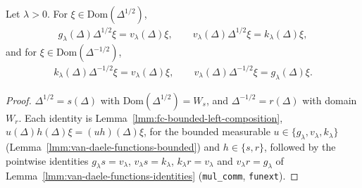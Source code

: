 \begin{lemma}
    \label{lmm:van-daele-fc-products}
    \leanok
    Let $\lambda > 0$. For $\xi \in \text{Dom}(\Delta^{1/2})$,
    \begin{align}
        g_\lambda(\Delta)\Delta^{1/2}\xi = v_\lambda(\Delta)\xi, \qquad v_\lambda(\Delta)\Delta^{1/2}\xi = k_\lambda(\Delta)\xi,
    \end{align}
    and for $\xi \in \text{Dom}(\Delta^{-1/2})$,
    \begin{align}
        k_\lambda(\Delta)\Delta^{-1/2}\xi = v_\lambda(\Delta)\xi, \qquad v_\lambda(\Delta)\Delta^{-1/2}\xi = g_\lambda(\Delta)\xi.
    \end{align}
\end{lemma}
\begin{proof}
    \leanok
    $\Delta^{1/2} = s(\Delta)$ with $\text{Dom}(\Delta^{1/2}) = W_s$, and $\Delta^{-1/2} = r(\Delta)$ with domain $W_r$. Each identity is Lemma~\ref{lmm:fc-bounded-left-composition}, $u(\Delta)h(\Delta)\xi = (uh)(\Delta)\xi$, for the bounded measurable $u \in \{g_\lambda, v_\lambda, k_\lambda\}$ (Lemma~\ref{lmm:van-daele-functions-bounded}) and $h \in \{s, r\}$, followed by the pointwise identities $g_\lambda s = v_\lambda$, $v_\lambda s = k_\lambda$, $k_\lambda r = v_\lambda$ and $v_\lambda r = g_\lambda$ of Lemma~\ref{lmm:van-daele-functions-identities} (\texttt{mul\_comm}, \texttt{funext}).
\end{proof}

